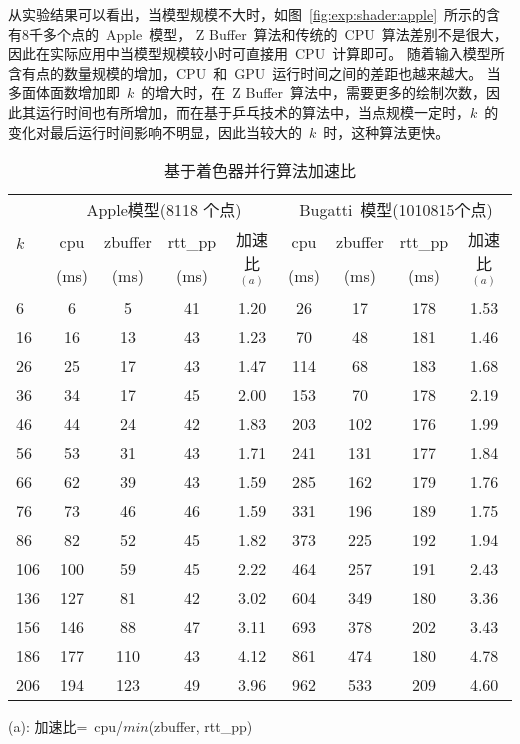 从实验结果可以看出，当模型规模不大时，如图~\ref{fig:exp:shader:apple}~所示的含有8千多个点的~Apple~模型，
Z Buffer~算法和传统的~CPU~算法差别不是很大，因此在实际应用中当模型规模较小时可直接用~CPU~计算即可。
随着输入模型所含有点的数量规模的增加，CPU~和~GPU~运行时间之间的差距也越来越大。
当多面体面数增加即~$k$~的增大时，在~Z Buffer~算法中，需要更多的绘制次数，因此其运行时间也有所增加，而在基于乒乓技术的算法中，当点规模一定时，$k$~的变化对最后运行时间影响不明显，因此当较大的~$k$~时，这种算法更快。
\begin{table}[htbp]
\centering
\caption{基于着色器并行算法加速比}
\label{tab:exper:shadertime}
\begin{minipage}[c]{\textwidth}
\begin{center}
  \begin{tabular}{p{1.5cm}<{\centering}cccc cccc} %
  \toprule[1.5pt]
  \multirow{3}{*}{$k$} & \multicolumn{4}{c}{Apple模型(8118 个点)} & \multicolumn{4}{c}{Bugatti~模型(1010815个点)}\\
  \cmidrule(lr){2-5}\cmidrule(lr){6-9}
  & cpu & zbuffer  & rtt\_pp & \multirow{2}{*}{加速比$^{(a)}$} & cpu  & zbuffer& rtt\_pp & \multirow{2}{*}{加速比$^{(a)}$} \\
  & (ms) & (ms)  & (ms) & & (ms)  & (ms) & (ms) \\
  \midrule[1pt]
 6	 & 6 	& 5 	& 41 &	1.20 &	26	& 17	&178  &	1.53 \\
16	 & 16	& 13	& 43 &	1.23 &	70	& 48	&181  &	1.46 \\
26	 & 25	& 17	& 43 &	1.47 &	114	& 68	&183  &	1.68 \\
36	 & 34	& 17	& 45 &	2.00 &	153	& 70	&178  &	2.19 \\
46	 & 44	& 24	& 42 &	1.83 &	203	& 102	&176  &	1.99 \\
56	 & 53	& 31	& 43 &	1.71 &	241	& 131	&177  &	1.84 \\
66	 & 62	& 39	& 43 &	1.59 &	285	& 162	&179  &	1.76 \\
76	 & 73	& 46	& 46 &	1.59 &	331	& 196	&189  &	1.75 \\
86	 & 82	& 52	& 45 &	1.82 &	373	& 225	&192  &	1.94 \\
106	 & 100	& 59	& 45 &	2.22 &	464	& 257	&191  &	2.43 \\
136	 & 127	& 81	& 42 &	3.02 &	604	& 349	&180  &	3.36 \\
156	 & 146	& 88	& 47 &	3.11 &	693	& 378	&202  &	3.43 \\
186	 & 177	& 110	& 43 &	4.12 &	861	& 474	&180  &	4.78 \\
206	 & 194	& 123	& 49 &	3.96 &	962	& 533	&209  &	4.60 \\
  \bottomrule[1.5pt]
\end{tabular}
\end{center}\vspace{-0.5em}
\hspace{1em}
\footnotesize (a): 加速比=~cpu/$min$(zbuffer, rtt\_pp)
\end{minipage}
\end{table}


